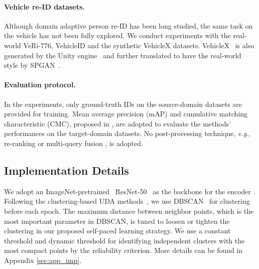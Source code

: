 \documentclass{article}
\newcommand{\eg}{\textit{e}.\textit{g}., }
\begin{document}

\vspace{-5pt}
\paragraph{Vehicle re-ID datasets.}
Although domain adaptive person re-ID has been long studied,
the same task on the vehicle has not been fully explored.
We conduct experiments with the real-world
VeRi-776, VehicleID and the synthetic VehicleX datasets.
VehicleX~\cite{naphade20204th} is also generated by the Unity engine~\cite{yao2019simulating,tang2019pamtri}
and further translated to have the real-world style by SPGAN~\cite{deng2018image}.


\vspace{-5pt}
\paragraph{Evaluation protocol.}
In the experiments, 
only ground-truth IDs on the source-domain datasets are provided for training. Mean average precision (mAP) and cumulative matching characteristic (CMC), proposed in \cite{market}, are adopted to evaluate the methods' performances on the target-domain datasets.
No post-processing technique, \eg re-ranking \cite{zhong2017re} or multi-query fusion \cite{market}, is adopted.


\subsection{Implementation Details}
\label{sec:imp}
\vspace{-5pt}

We adopt an ImageNet-pretrained~\cite{deng2009imagenet} ResNet-50~\cite{he2016deep} as the backbone for the encoder .
Following the clustering-based UDA methods~\cite{ge2020mutual,yang2019selfsimilarity,song2018unsupervised}, 
we use DBSCAN~\cite{ester1996density} 
for clustering before each epoch.
The maximum distance between neighbor points, which is the most important parameter in DBSCAN,
is tuned to loosen or tighten the clustering in our proposed self-paced learning strategy.
We use a constant threshold  and dynamic threshold  for identifying independent clusters with the most compact points by the reliability criterion.
More details can be found in Appendix 
\ref{sec:app_imp}.
\end{document}
